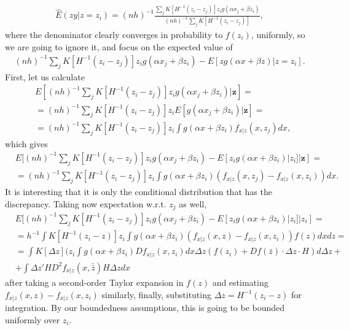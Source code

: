 \documentclass{article}
\theoremstyle{definition}
\theoremstyle{remark}
\begin{document}
\begin{align}
    \hat{E}(zy|z=z_i)= (nh)^{-1}\frac{\sum_j K[H^{-1}(z_i-z_j)] z_i g(\alpha x_j + \beta z_i)}{(nh)^{-1}\sum_j K[H^{-1}(z_i-z_j)]},
\end{align}
where the denominator clearly converges in probability to $f(z_i)$, uniformly, so we are going to ignore it, and focus on the expected value of
\begin{align}
   (nh)^{-1}\sum_j K[H^{-1}(z_i-z_j)] z_i g(\alpha x_j + \beta z_i)-E[z g(\alpha x + \beta z)|z=z_i].
\end{align}
First, let us calculate
\begin{align}
    &E[(nh)^{-1}\sum_j K[H^{-1}(z_i-z_j)] z_i g(\alpha x_j + \beta z_i)|\mathbf{z}]= \\
    &=(nh)^{-1}\sum_j K[H^{-1}(z_i-z_j)] z_i E[g(\alpha x_j + \beta z_i)|\mathbf{z}]= \nonumber \\
    &= (nh)^{-1}\sum_j K[H^{-1}(z_i-z_j)] z_i \int g(\alpha x + \beta z_i) f_{x|z}(x,z_j) dx,\nonumber
\end{align}
which gives
\begin{align}
   &E[(nh)^{-1}\sum_j K[H^{-1}(z_i-z_j)] z_i g(\alpha x_j + \beta z_i)-E[z_i g(\alpha x + \beta z_i)|z_i]|\mathbf{z}]= \\
   &=(nh)^{-1}\sum_j K[H^{-1}(z_i-z_j)] z_i \int g(\alpha x + \beta z_i) (f_{x|z}(x,z_j)-f_{x|z}(x,z_i)) dx. \nonumber
\end{align}
It is interesting that it is only the conditional distribution that has the discrepancy. Taking now expectation w.r.t. $z_j$ as well,
\begin{align}
   &E[(nh)^{-1}\sum_j K[H^{-1}(z_i-z_j)] z_i g(\alpha x_j + \beta z_i)-E[z_i g(\alpha x + \beta z_i)|z_i]|z_i]= \\
   &=h^{-1}\int K[H^{-1}(z_i-z)] z_i \int g(\alpha x + \beta z_i) (f_{x|z}(x,z)-f_{x|z}(x,z_i)) f(z) dxdz= \nonumber \\
   &= \int K[\Delta z] (z_i \int g(\alpha x+\beta z_i)Df_{x|z}(x,z_i) dx \Delta z (f(z_i) + Df(\bar{z})\cdot \Delta z \cdot H ) d \Delta z + \nonumber\\
   &+ \int \Delta z' H  D^2f_{x|z}(x,\bar{\bar{z}})H \Delta z dx \nonumber
\end{align}
after taking a second-order Taylor expansion in $f(z)$ and estimating $f_{x|z}(x,z)-f_{x|z}(x,z_i)$ similarly, finally, substituting $\Delta z= H^{-1}(z_i-z)$ for integration. By our boundedness assumptions, this is going to be bounded uniformly over $z_i$.
\end{document}
